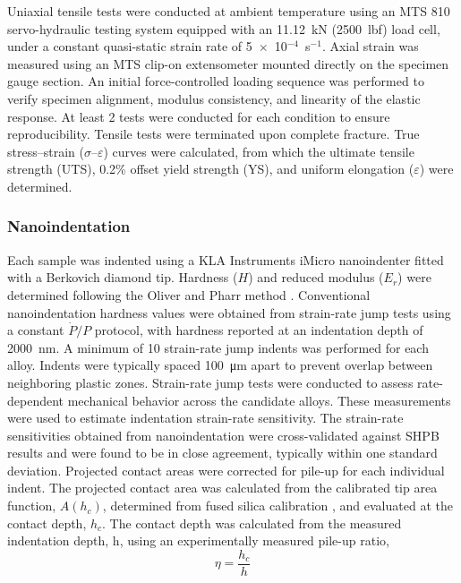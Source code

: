 \documentclass[preprint,12pt,times]{elsarticle}  %
\begin{document}
Uniaxial tensile tests were conducted at ambient temperature using an MTS 810 servo-hydraulic testing system equipped with an 11.12~kN (2500~lbf) load cell, under a constant quasi-static strain rate of 5~$\times$~10$^{-4}$~s$^{-1}$. Axial strain was measured using an MTS clip-on extensometer mounted directly on the specimen gauge section. An initial force-controlled loading sequence was performed to verify specimen alignment, modulus consistency, and linearity of the elastic response. At least 2 tests were conducted for each condition to ensure reproducibility. Tensile tests were terminated upon complete fracture. True stress--strain ($\sigma$--$\varepsilon$) curves were calculated, from which the ultimate tensile strength (UTS), 0.2\% offset yield strength (YS), and uniform elongation ($\varepsilon$) were determined.

\subsubsection{Nanoindentation}



Each sample was indented using a KLA Instruments iMicro nanoindenter fitted with a Berkovich diamond tip. Hardness ($H$) and reduced modulus ($E_r$) were determined following the Oliver and Pharr method \cite{Oliver1992}. Conventional nanoindentation hardness values were obtained from strain-rate jump tests using a constant $\dot{P}\!/P$ protocol, with hardness reported at an indentation depth of \SI{2000}{\nano\meter}. A minimum of 10 strain-rate jump indents was performed for each alloy. Indents were typically spaced \SI{100}{\micro\meter} apart to prevent overlap between neighboring plastic zones.
Strain-rate jump tests were conducted to assess rate-dependent mechanical behavior across the candidate alloys. These measurements were used to estimate indentation strain-rate sensitivity. The strain-rate sensitivities obtained from nanoindentation were cross-validated against SHPB results and were found to be in close agreement, typically within one standard deviation.
Projected contact areas were corrected for pile-up for each individual indent. The projected contact area was calculated from the calibrated tip area function, $A(h_c)$, determined from fused silica calibration \cite{Oliver1992}, and evaluated at the contact depth, $h_c$. The contact depth was calculated from the measured indentation depth, h, using an experimentally measured pile-up ratio,
\[
\eta = \frac{h_c}{h}
\]
\end{document}
